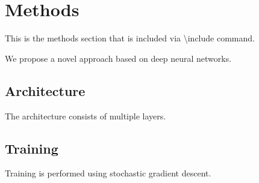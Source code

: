 \section{Methods}

This is the methods section that is included via \textbackslash include command.

We propose a novel approach based on deep neural networks.

\subsection{Architecture}

The architecture consists of multiple layers.

\subsection{Training}

Training is performed using stochastic gradient descent.
